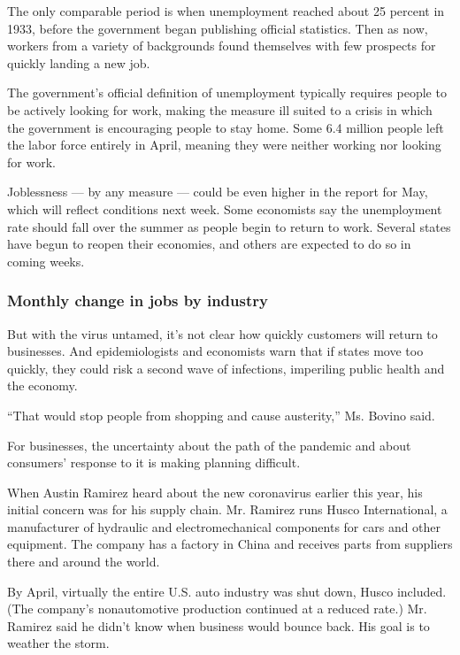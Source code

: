 The only comparable period is when unemployment reached about 25 percent
in 1933, before the government began publishing official statistics.
Then as now, workers from a variety of backgrounds found themselves with
few prospects for quickly landing a new job.

The government's official definition of unemployment typically requires
people to be actively looking for work, making the measure ill suited to
a crisis in which the government is encouraging people to stay home.
Some 6.4 million people left the labor force entirely in April, meaning
they were neither working nor looking for work.

Joblessness --- by any measure --- could be even higher in the report
for May, which will reflect conditions next week. Some economists say
the unemployment rate should fall over the summer as people begin to
return to work. Several states have begun to reopen their economies, and
others are expected to do so in coming weeks.

\hypertarget{monthly-change-in-jobs-by-industry}{%
\subsubsection{Monthly change in jobs by
industry}\label{monthly-change-in-jobs-by-industry}}

But with the virus untamed, it's not clear how quickly customers will
return to businesses. And epidemiologists and economists warn that if
states move too quickly, they could risk a second wave of infections,
imperiling public health and the economy.

``That would stop people from shopping and cause austerity,'' Ms. Bovino
said.

For businesses, the uncertainty about the path of the pandemic and about
consumers' response to it is making planning difficult.

When Austin Ramirez heard about the new coronavirus earlier this year,
his initial concern was for his supply chain. Mr. Ramirez runs Husco
International, a manufacturer of hydraulic and electromechanical
components for cars and other equipment. The company has a factory in
China and receives parts from suppliers there and around the world.

By April, virtually the entire U.S. auto industry was shut down, Husco
included. (The company's nonautomotive production continued at a reduced
rate.) Mr. Ramirez said he didn't know when business would bounce back.
His goal is to weather the storm.

